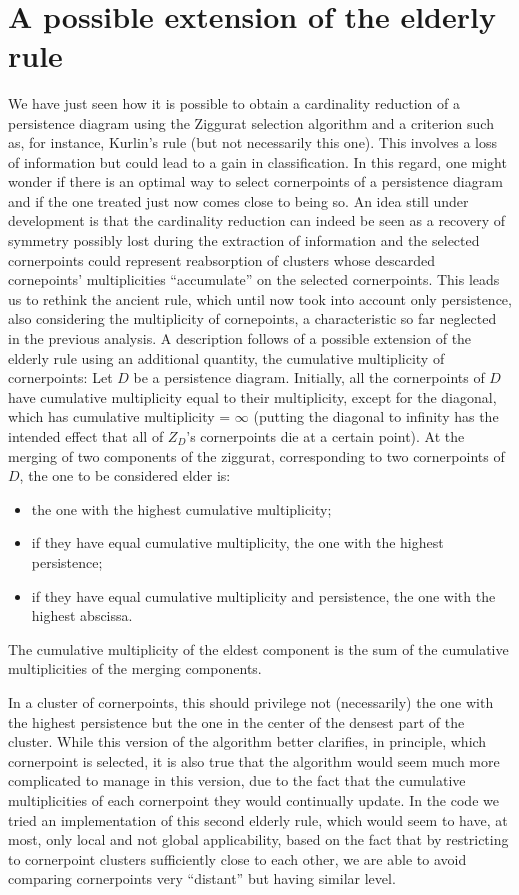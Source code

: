 \documentclass[english, LaM, oneside, noexaminfo]{sapthesis}
\begin{document}
\

\section{A possible extension of the elderly rule}

We have just seen how it is possible to obtain a cardinality reduction of a persistence diagram using the Ziggurat selection algorithm and a criterion such as, for instance, Kurlin's rule (but not necessarily this one). This involves a loss of information but could lead to a gain in classification. In this regard, one might wonder if there is an optimal way to select cornerpoints of a persistence diagram and if the one treated just now comes close to being so. An idea still under development is that the  cardinality reduction can indeed be seen as a recovery of symmetry possibly lost during the extraction of information and the selected cornerpoints could represent reabsorption of clusters whose  descarded cornepoints' multiplicities ``accumulate'' on the selected cornerpoints. This leads us to rethink the ancient rule, which until now took into account only persistence, also considering the multiplicity of cornepoints, a characteristic so far neglected in the previous analysis.
A description follows of a possible extension of the elderly rule using an additional quantity, the cumulative multiplicity of cornerpoints:
Let $D$ be a persistence diagram. Initially, all the cornerpoints of $D$ have cumulative multiplicity equal to their multiplicity, except for the diagonal, which has cumulative multiplicity = $\infty$ (putting the diagonal to infinity has the intended effect that all of $Z_D$'s cornerpoints die at a certain point).
At the merging of two components of the ziggurat, corresponding to two cornerpoints of $D$, the one to be considered elder is:
\begin{itemize}
\item the one with the highest cumulative multiplicity;
\item if they have equal cumulative multiplicity, the one with the highest persistence;
\item if they have equal cumulative multiplicity and persistence, the one with the highest abscissa.
\end{itemize}
The cumulative multiplicity of the eldest component is the sum of the cumulative multiplicities of the merging components.

\noindent In a cluster of cornerpoints, this should privilege not (necessarily) the one with the highest persistence but the one in the center of the densest part of the cluster.
While this version of the algorithm better clarifies, in principle, which cornerpoint is selected, it is also true that the algorithm would seem much more complicated to manage in this version, due to the fact that the cumulative multiplicities of each cornerpoint they would continually update. In the code we tried an implementation of this second elderly rule, which would seem to have, at most, only local and not global applicability, based on the fact that by restricting to cornerpoint clusters sufficiently close to each other, we are able to avoid comparing cornerpoints very ``distant'' but having similar level.
\end{document}
